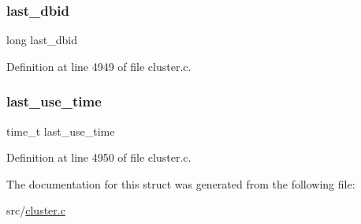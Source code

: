 \subsubsection{\texorpdfstring{last\+\_\+dbid}{last\_dbid}}
{\footnotesize\ttfamily long last\+\_\+dbid}



Definition at line 4949 of file cluster.\+c.

\mbox{\label{structmigrate_cached_socket_ac765d15ca6e1c4d1435bd80ff2a93a2c}} 
\subsubsection{\texorpdfstring{last\+\_\+use\+\_\+time}{last\_use\_time}}
{\footnotesize\ttfamily time\+\_\+t last\+\_\+use\+\_\+time}



Definition at line 4950 of file cluster.\+c.



The documentation for this struct was generated from the following file\+:\begin{DoxyCompactItemize}
\item 
src/\hyperlink{cluster_8c}{cluster.\+c}\end{DoxyCompactItemize}

